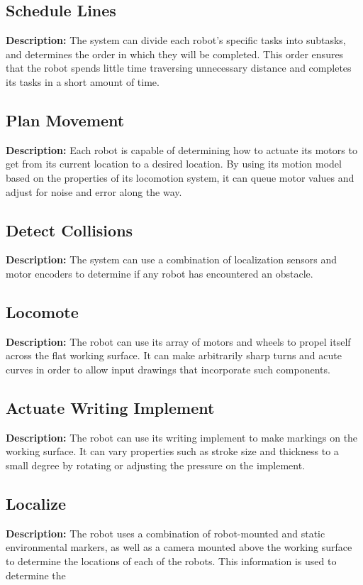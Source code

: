 \subsection{Schedule Lines}
\textbf{Description:} The system can divide each robot's specific tasks into subtasks, and determines the order in which they will be completed. This order ensures that the robot spends little time traversing unnecessary distance and completes its tasks in a short amount of time.

\subsection{Plan Movement}
\textbf{Description:} Each robot is capable of determining how to actuate its motors to get from its current location to a desired location. By using its motion model based on the properties of its locomotion system, it can queue motor values and adjust for noise and error along the way.

\subsection{Detect Collisions}
\textbf{Description:} The system can use a combination of localization sensors and motor encoders to determine if any robot has encountered an obstacle. 

\subsection{Locomote}
\textbf{Description:} The robot can use its array of motors and wheels to propel itself across the flat working surface. It can make arbitrarily sharp turns and acute curves in order to allow input drawings that incorporate such components. 

\subsection{Actuate Writing Implement}
\textbf{Description:} The robot can use its writing implement to make markings on the working surface. It can vary properties such as stroke size and thickness to a small degree by rotating or adjusting the pressure on the implement.

\subsection{Localize}
\textbf{Description:} The robot uses a combination of robot-mounted and static environmental markers, as well as a camera mounted above the working surface to determine the locations of each of the robots. This information is used to determine the 

